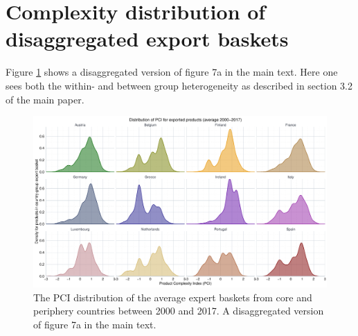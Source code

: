 \documentclass[11pt,a4paper]{article}
\begin{document}
\section{Complexity distribution of disaggregated export baskets}\label{ap:exp-densities}
Figure \ref{fig:exp-dens} shows a disaggregated version of figure 7a in the main text.
Here one sees both the within- and between group heterogeneity as described in section 3.2 of the main paper.

\begin{figure}[h]
\centering
\includegraphics[width=\textwidth]{../output/fig_A2_exp_dists.pdf}
\caption{The PCI distribution of the average expert baskets from core and periphery countries between 2000 and 2017. A disaggregated version of figure 7a in the main text.}\label{fig:exp-dens}
\end{figure}

\clearpage
\printbibliography
\end{document}
